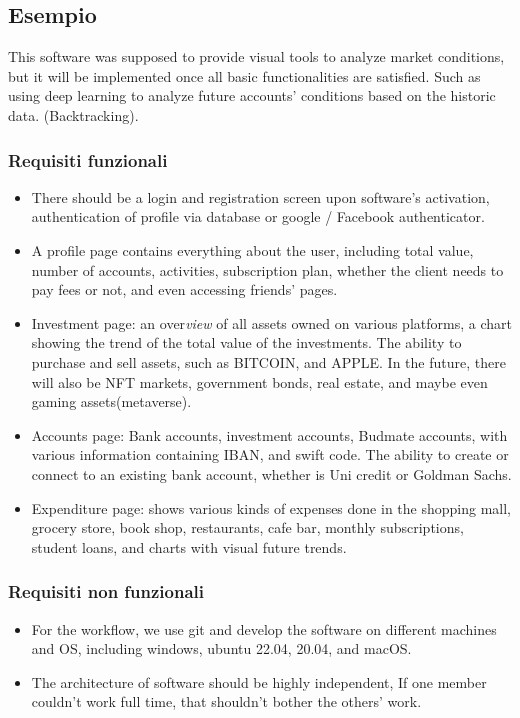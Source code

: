 \documentclass[a4paper,12pt]{report}
\begin{document}
\subsection*{Esempio}
This software was supposed to provide visual tools to analyze market conditions, but it will be implemented once all basic functionalities are satisfied.
%
Such as using deep learning to analyze future accounts' conditions based on the historic data. (Backtracking).

\subsubsection{Requisiti funzionali}
\begin{itemize}
	\item There should be a login and registration screen upon software's activation, authentication of profile via database or google / Facebook authenticator.
    \item A profile page contains everything about the user, including total value, number of accounts, activities, subscription plan, whether the client needs to pay fees or not, and even accessing friends' pages.
    \item Investment page: an over\textit{view} of all assets owned on various platforms, a chart showing the trend of the total value of the investments. The ability to purchase and sell assets, such as BITCOIN, and APPLE. In the future, there will also be NFT markets, government bonds, real estate, and maybe even gaming assets(metaverse).
    \item Accounts page: Bank accounts, investment accounts, Budmate accounts, with various information containing IBAN, and swift code. 
    The ability to create or connect to an existing bank account, whether is Uni credit or Goldman Sachs.
    \item Expenditure page:  shows various kinds of expenses done in the shopping mall, grocery store, book shop, restaurants, cafe bar, monthly subscriptions, student loans, and charts with visual future trends.
\end{itemize}

\subsubsection{Requisiti non funzionali}
\begin{itemize}
    \item For the workflow, we use git and develop the software on different machines and OS, including windows, ubuntu 22.04, 20.04, and macOS. 
    \item The architecture of software should be highly independent, If one member couldn't work full time, that shouldn't bother the others' work.
\end{itemize}
\end{document}
